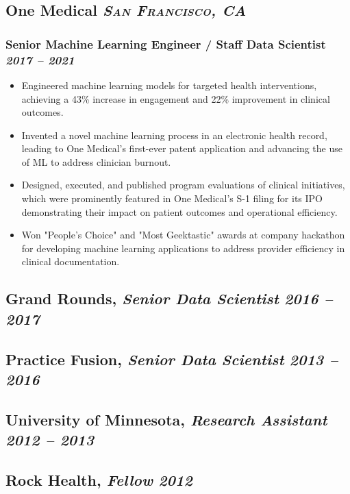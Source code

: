 \documentclass[11pt]{article}
\newcommand{\rside}[1]{
  \hfill {\itshape #1}%
}
\begin{document}
\subsection{One Medical \rside{\normalfont\large\bfseries\scshape{San Francisco, CA}}}
\subsubsection{Senior Machine Learning Engineer / Staff Data Scientist \rside{2017 -- 2021}}
\begin{itemize}[label=-]
  \item Engineered machine learning models for targeted health interventions, achieving a \textcolor{Bittersweet}{43\% increase in engagement} and \textcolor{Bittersweet}{22\% improvement in clinical outcomes}.
  \item Invented a novel machine learning process in an electronic health record, leading to \textcolor{Bittersweet}{One Medical's first-ever patent application} and advancing the use of ML to address clinician burnout.
  \item Designed, executed, and published program evaluations of clinical initiatives, which were prominently featured in \textcolor{Bittersweet}{One Medical’s S-1 filing for its IPO} demonstrating their impact on patient outcomes and operational efficiency.
  \item Won \textcolor{Bittersweet}{"People's Choice" and "Most Geektastic" awards} at company hackathon for developing machine learning applications to address provider efficiency in clinical documentation.
\end{itemize}

\subsection{Grand Rounds, \normalfont\textit{Senior Data Scientist} \rside{2016 -- 2017}}
\subsection{Practice Fusion, \normalfont\textit{Senior Data Scientist} \rside{2013 -- 2016}}
\subsection{University of Minnesota, \normalfont\textit{Research Assistant} \rside{2012 -- 2013}}
\subsection{Rock Health, \normalfont\textit{Fellow} \rside{2012}}
\bigskip
\end{document}
